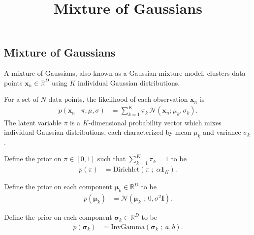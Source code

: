 \title{Mixture of Gaussians}

\subsection{Mixture of Gaussians}

A mixture of Gaussians, also known as a Gaussian mixture model,
clusters data points $\mathbf{x}_n\in\mathbb{R}^D$ using $K$
individual Gaussian distributions.

For a set of $N$ data points,
the likelihood of each observation $\mathbf{x}_n$ is
\begin{align*}
  p(\mathbf{x}_n \mid \pi, \mu, \sigma)
  &=
  \sum_{k=1}^K \pi_k \, \mathcal{N}(\mathbf{x}_n ; \mu_k, \sigma_k).
\end{align*}
The latent variable $\pi$ is a $K$-dimensional probability vector
which mixes individual Gaussian distributions, each
characterized by mean $\mu_k$ and variance $\sigma_k$.

Define the prior on $\pi\in[0,1]$ such that $\sum_{k=1}^K\pi_k=1$ to be
\begin{align*}
  p(\pi)
  &=
  \text{Dirichlet}(\pi \;;\; \alpha \mathbf{1}_{K}).
\end{align*}

Define the prior on each component $\mathbf{\mu}_k\in\mathbb{R}^D$ to be
\begin{align*}
  p(\mathbf{\mu}_k)
  &=
  \mathcal{N}(\mathbf{\mu}_k \;;\; 0, \sigma^2\mathbf{I}).
\end{align*}

Define the prior on each component $\mathbf{\sigma}_k\in\mathbb{R}^D$ to be
\begin{align*}
  p(\mathbf{\sigma}_k)
  &=
  \text{InvGamma}(\mathbf{\sigma}_k \;;\; a, b).
\end{align*}

